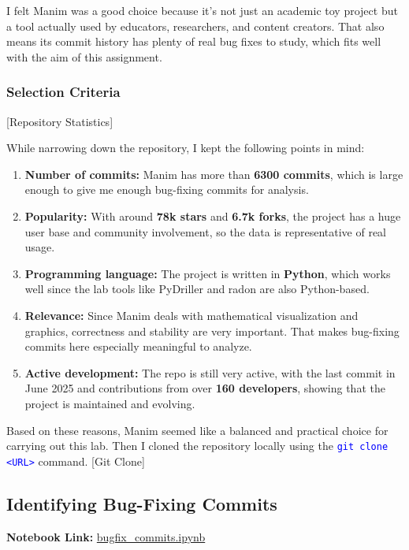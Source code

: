\documentclass[10pt,a4paper]{report}
\newcommand{\command}[1]{\texttt{\textcolor{blue}{#1}}}
\begin{document}
I felt Manim was a good choice because it’s not just an academic toy project but a tool actually used by educators, researchers, and content creators. That also means its commit history has plenty of real bug fixes to study, which fits well with the aim of this assignment.

\subsubsection{Selection Criteria}
[Repository Statistics]

While narrowing down the repository, I kept the following points in mind:
\begin{enumerate}
    \item \textbf{Number of commits:} Manim has more than \textbf{6300 commits}, which is large enough to give me enough bug-fixing commits for analysis.
    \item \textbf{Popularity:} With around \textbf{78k stars} and \textbf{6.7k forks}, the project has a huge user base and community involvement, so the data is representative of real usage.
    \item \textbf{Programming language:} The project is written in \textbf{Python}, which works well since the lab tools like PyDriller and radon are also Python-based.
    \item \textbf{Relevance:} Since Manim deals with mathematical visualization and graphics, correctness and stability are very important. That makes bug-fixing commits here especially meaningful to analyze.
    \item \textbf{Active development:} The repo is still very active, with the last commit in June 2025 and contributions from over \textbf{160 developers}, showing that the project is maintained and evolving.
\end{enumerate}

Based on these reasons, Manim seemed like a balanced and practical choice for carrying out this lab. Then I cloned the repository locally using the \command{git clone <URL>} command.
[Git Clone]

\subsection{Identifying Bug-Fixing Commits}
\textbf{Notebook Link:} \href{https://github.com/ShardulJunagade/cs202-stt/lab2/bugfix_commits.ipynb}{bugfix\_commits.ipynb}
\end{document}
